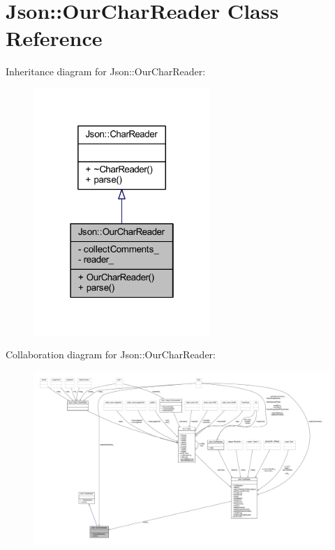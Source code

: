 \hypertarget{class_json_1_1_our_char_reader}{}\section{Json\+:\+:Our\+Char\+Reader Class Reference}
\label{class_json_1_1_our_char_reader}


Inheritance diagram for Json\+:\+:Our\+Char\+Reader\+:\nopagebreak
\begin{figure}[H]
\begin{center}
\leavevmode
\includegraphics[width=190pt]{class_json_1_1_our_char_reader__inherit__graph}
\end{center}
\end{figure}


Collaboration diagram for Json\+:\+:Our\+Char\+Reader\+:\nopagebreak
\begin{figure}[H]
\begin{center}
\leavevmode
\includegraphics[width=350pt]{class_json_1_1_our_char_reader__coll__graph}
\end{center}
\end{figure}
